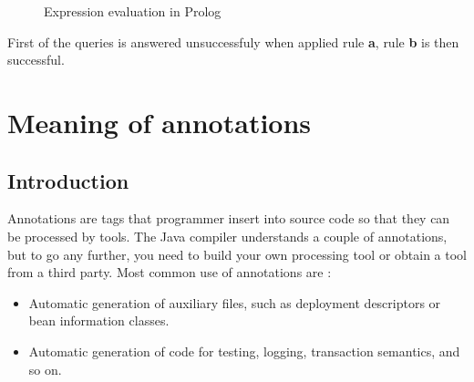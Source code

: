 \documentclass[11pt,twoside,a4paper]{book}
\begin{document}
\setlength{\parskip}{1cm plus4mm minus3mm}


\begin{figure}[ht]
{}
\caption{Expression evaluation in Prolog}

\end{figure}



First of the queries is answered unsuccessfuly when applied rule \textbf{a},
rule \textbf{b} is then successful.


\chapter{Meaning of annotations}

\section{Introduction}
Annotations are tags that programmer insert into source code so that they
can be processed by tools. The Java compiler understands a couple of
annotations, but to go any further, you need to build your own processing tool
or obtain a tool from a third party. Most common use of annotations are
\cite{horstmannCornell:coreJava}:

\begin{itemize}
  \item Automatic generation of auxiliary files, such as deployment descriptors or bean information classes.
  \item Automatic generation of code for testing, logging, transaction semantics, and so on.
\end{itemize}
\end{document}
